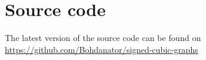 \chapter{Source code}

The latest version of the source code can be found on \url{https://github.com/Bohdanator/signed-cubic-graphs}
